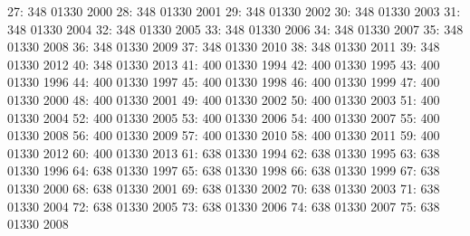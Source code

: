 \documentclass[nojss]{jss}
\begin{document}
\begin{Schunk}
\begin{Soutput}
 27:               348           01330           2000
 28:               348           01330           2001
 29:               348           01330           2002
 30:               348           01330           2003
 31:               348           01330           2004
 32:               348           01330           2005
 33:               348           01330           2006
 34:               348           01330           2007
 35:               348           01330           2008
 36:               348           01330           2009
 37:               348           01330           2010
 38:               348           01330           2011
 39:               348           01330           2012
 40:               348           01330           2013
 41:               400           01330           1994
 42:               400           01330           1995
 43:               400           01330           1996
 44:               400           01330           1997
 45:               400           01330           1998
 46:               400           01330           1999
 47:               400           01330           2000
 48:               400           01330           2001
 49:               400           01330           2002
 50:               400           01330           2003
 51:               400           01330           2004
 52:               400           01330           2005
 53:               400           01330           2006
 54:               400           01330           2007
 55:               400           01330           2008
 56:               400           01330           2009
 57:               400           01330           2010
 58:               400           01330           2011
 59:               400           01330           2012
 60:               400           01330           2013
 61:               638           01330           1994
 62:               638           01330           1995
 63:               638           01330           1996
 64:               638           01330           1997
 65:               638           01330           1998
 66:               638           01330           1999
 67:               638           01330           2000
 68:               638           01330           2001
 69:               638           01330           2002
 70:               638           01330           2003
 71:               638           01330           2004
 72:               638           01330           2005
 73:               638           01330           2006
 74:               638           01330           2007
 75:               638           01330           2008

\end{Soutput}
\end{Schunk}
\end{document}
